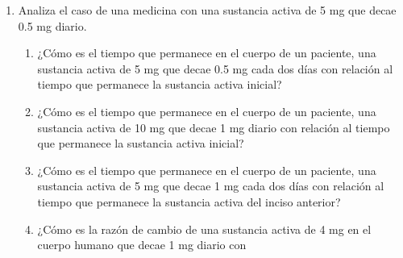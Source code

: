 \documentclass[11pt]{book}
\begin{document}
\begin{enumerate}
  \item Analiza el caso de una medicina con una sustancia activa de 5 mg que decae 0.5 mg diario.
        \begin{enumerate}
          \item ¿Cómo es el tiempo que permanece en el cuerpo de un paciente, una sustancia activa
                de 5 mg que decae 0.5 mg cada dos días con relación al tiempo que permanece la sustancia activa inicial?\\
          \item¿Cómo es el tiempo que permanece en el cuerpo de un paciente, una sustancia activa de 10 mg que decae
                1 mg diario con relación al tiempo que permanece la sustancia activa inicial?\\
          \item ¿Cómo es el tiempo que permanece en el cuerpo de un paciente, una sustancia activa de 5 mg que decae 1 mg
                cada dos días con relación al tiempo que permanece la sustancia activa del inciso anterior?\\
          \item ¿Cómo es la razón de cambio de una sustancia activa de 4 mg en el cuerpo humano que decae 1 mg diario con

\end{enumerate}
\end{enumerate}
\end{document}
